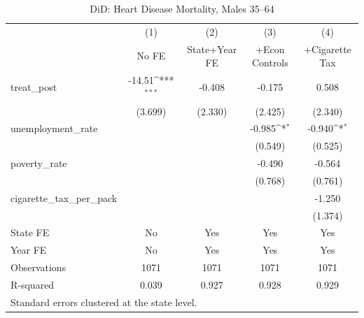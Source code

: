 \begin{table}[htbp]\centering
\def\sym#1{\ifmmode^{#1}\else\(^{#1}\)\fi}
\caption{DiD: Heart Disease Mortality, Males 35--64}
\begin{tabular}{l*{4}{c}}
\toprule
                    &\multicolumn{1}{c}{(1)}&\multicolumn{1}{c}{(2)}&\multicolumn{1}{c}{(3)}&\multicolumn{1}{c}{(4)}\\
                    &\multicolumn{1}{c}{No FE}&\multicolumn{1}{c}{State+Year FE}&\multicolumn{1}{c}{+Econ Controls}&\multicolumn{1}{c}{+Cigarette Tax}\\
\midrule
treat\_post          &      -14.51\sym{***}&      -0.408         &      -0.175         &       0.508         \\
                    &     (3.699)         &     (2.330)         &     (2.425)         &     (2.340)         \\
\addlinespace
unemployment\_rate   &                     &                     &      -0.985\sym{*}  &      -0.940\sym{*}  \\
                    &                     &                     &     (0.549)         &     (0.525)         \\
\addlinespace
poverty\_rate        &                     &                     &      -0.490         &      -0.564         \\
                    &                     &                     &     (0.768)         &     (0.761)         \\
\addlinespace
cigarette\_tax\_per\_pack&                     &                     &                     &      -1.250         \\
                    &                     &                     &                     &     (1.374)         \\
\midrule
State FE            &          No         &         Yes         &         Yes         &         Yes         \\
Year FE             &          No         &         Yes         &         Yes         &         Yes         \\
Observations        &        1071         &        1071         &        1071         &        1071         \\
R-squared           &       0.039         &       0.927         &       0.928         &       0.929         \\
\bottomrule
\multicolumn{5}{l}{\footnotesize Standard errors clustered at the state level.}\\
\end{tabular}
\end{table}
